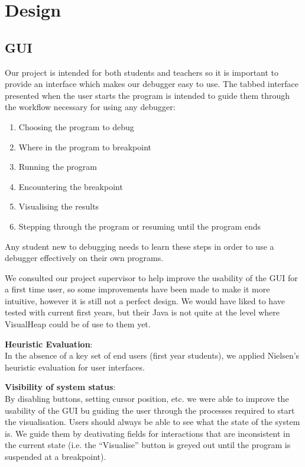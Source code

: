 \documentclass[11pt, a4paper]{report}
\begin{document}
\chapter{Design}

\section{GUI}

Our project is intended for both students and teachers so it is important to provide an interface which makes our debugger easy to use. The tabbed interface presented when the user starts the program is intended to guide them through the workflow necessary for using any debugger:

\begin{enumerate}

  \item Choosing the program to debug
  \item Where in the program to breakpoint
  \item Running the program
  \item Encountering the breakpoint
  \item Visualising the results
  \item Stepping through the program or resuming until the program ends
  
\end{enumerate}

Any student new to debugging needs to learn these steps in order to use a debugger effectively on their own programs.

We consulted our project supervisor to help improve the usability of the GUI for a first time user, so some improvements have been made to make it more intuitive, however it is still not a perfect design. We would have liked to have tested with current first years, but their Java is not quite at the level where VisualHeap could be of use to them yet. 

{\bfseries Heuristic Evaluation}: \\
In the absence of a key set of end users (first year students), we applied Nielsen’s heuristic evaluation for user interfaces.

{\bfseries Visibility of system status}: \\
By disabling buttons, setting cursor position, etc. we were able to improve the usability of the GUI bu guiding the user through the processes required to start the visualisation. Users should always be able to see what the state of the system is. We guide them by deativating fields for interactions that are inconsistent in the current state (i.e. the “Visualise” button is greyed out until the program is suspended at a breakpoint).
\end{document}
